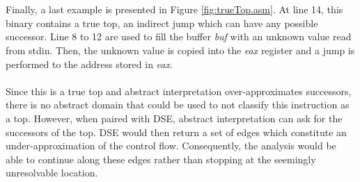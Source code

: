 \documentclass{kththesis}
\renewcommand{\it}[1]{\textit{#1}}
\begin{document}
\\ \\ 
Finally, a last example is presented in Figure \ref{fig:trueTop.asm}. At line 14, this binary contains a true top, an indirect jump which can have any possible successor. Line 8 to 12 are used to fill the buffer \it{buf} with an unknown value read from stdin. Then, the unknown value is copied into the \it{eax} register and a jump is performed to the address stored in \it{eax}.
\\ \\
Since this is a true top and abstract interpretation over-approximates successors, there is no abstract domain that could be used to not classify this instruction as a top. However, when paired with DSE, abstract interpretation can ask for the successors of the top. DSE would then return a set of edges which constitute an under-approximation of the control flow. Consequently, the analysis would be able to continue along these edges rather than stopping at the seemingly unresolvable location.
\end{document}
